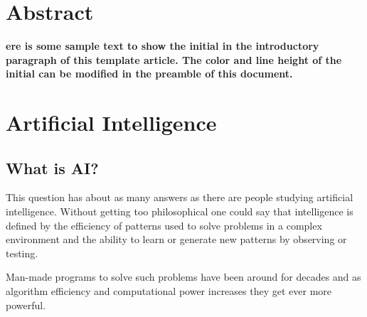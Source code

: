 %
%
%
%






\begin{titlepage}
  \thispagestyle{empty}
  \maketitle %
\end{titlepage}


\tableofcontents

\chapter{Abstract}
\textbf{ere is some sample text to show the initial in the introductory paragraph of this template article. The color and line height of the initial can be modified in the preamble of this document.}

\chapter{Artificial Intelligence}
\section{What is AI?}

This question has about as many answers as there are people studying artificial intelligence. Without getting too philosophical one could say that intelligence is defined by the efficiency of patterns used to solve problems in a complex environment and the ability to learn or generate new patterns by observing or testing.

Man-made programs to solve such problems have been around for decades and as algorithm efficiency and computational power increases they get ever more powerful.

